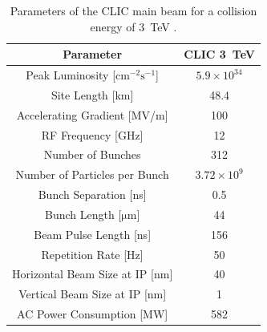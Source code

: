 \begin{table}
  \begin{center}
  	\begin{tabular}{| c c |}
	   \hline
       Parameter & CLIC 3~TeV\\
       \hline
       Peak Luminosity [\(\mathrm{cm^{-2}s^{-1}}\)] & \(5.9\times10^{34}\) \\
       Site Length [km] & 48.4 \\
       Accelerating Gradient [MV/m] & 100 \\
	   RF Frequency [GHz] & 12 \\
	   Number of Bunches & 312 \\
	   Number of Particles per Bunch & \(3.72\times10^9\) \\
	   Bunch Separation [ns] & 0.5 \\
	   Bunch Length [\(\mathrm{\mu m}\)] & 44 \\
	   Beam Pulse Length [ns]  & 156 \\
	   Repetition Rate [Hz] & 50 \\
	   Horizontal Beam Size at IP [nm] & 40 \\
	   Vertical Beam Size at IP [nm] & 1 \\
	   AC Power Consumption [MW] & 582 \\
	   \hline
    \end{tabular}
    \caption{Parameters of the CLIC main beam for a collision energy of 3~TeV \cite{clicCDR}.}
  	\label{t:clicParams}
  \end{center}
\end{table}


